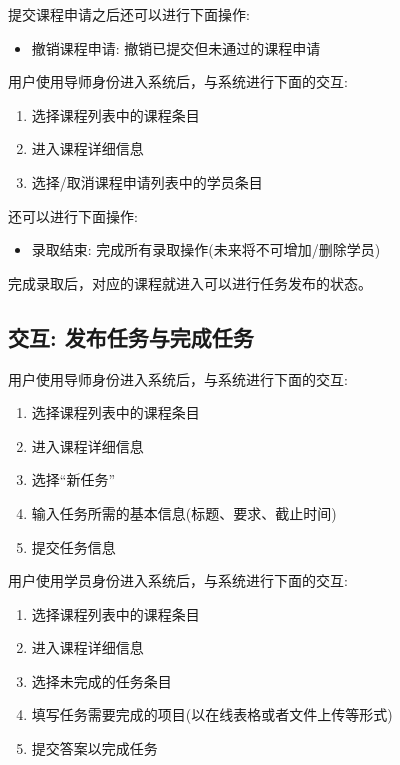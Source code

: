 提交课程申请之后还可以进行下面操作:

\begin{itemize}
  \item 撤销课程申请: 撤销已提交但未通过的课程申请
\end{itemize}

用户使用导师身份进入系统后，与系统进行下面的交互:

\begin{enumerate}
  \item 选择课程列表中的课程条目
  \item 进入课程详细信息
  \item 选择/取消课程申请列表中的学员条目
\end{enumerate}

还可以进行下面操作:

\begin{itemize}
  \item 录取结束: 完成所有录取操作(未来将不可增加/删除学员)
\end{itemize}

完成录取后，对应的课程就进入可以进行任务发布的状态。

\subsection {交互: 发布任务与完成任务}

用户使用导师身份进入系统后，与系统进行下面的交互:

\begin{enumerate}
  \item 选择课程列表中的课程条目
  \item 进入课程详细信息
  \item 选择“新任务”
  \item 输入任务所需的基本信息(标题、要求、截止时间)
  \item 提交任务信息
\end{enumerate}

用户使用学员身份进入系统后，与系统进行下面的交互:

\begin{enumerate}
  \item 选择课程列表中的课程条目
  \item 进入课程详细信息
  \item 选择未完成的任务条目
  \item 填写任务需要完成的项目(以在线表格或者文件上传等形式)
  \item 提交答案以完成任务
\end{enumerate}

